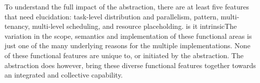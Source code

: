 \documentclass{sig-alternate}
\begin{document}







To understand the full impact of the \pilot abstraction, there are at least five
features that need elucidation: task-level distribution and parallelism, \MW
pattern, multi-tenancy, multi-level scheduling, and resource placeholding.
  is it intrinsicThe
variation in the scope, semantics and implementation of these functional areas
is just one of the many underlying reasons for the multiple \pilotjob
implementations.  None of these functional features are unique to, or initiated
by the \pilot abstraction. The \pilot abstraction does however, bring these
diverse functional features together towards an integrated and collective
capability.
\end{document}
